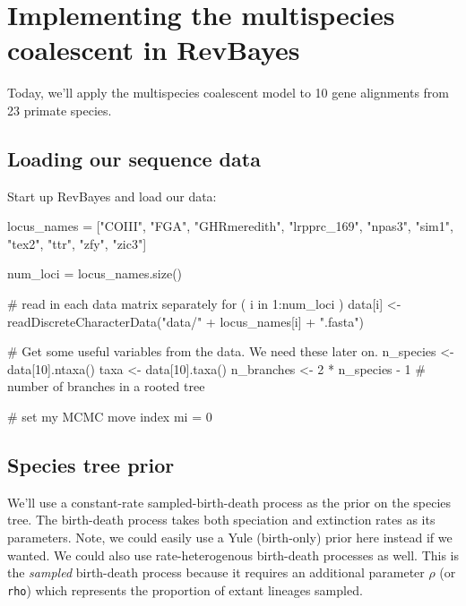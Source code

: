 \documentclass[11pt]{article}
\begin{document}
\section{Implementing the multispecies coalescent in RevBayes}

Today, we'll apply the multispecies coalescent model to 10 gene alignments from 23 primate species.

\subsection{Loading our sequence data}

Start up RevBayes and load our data:
\begin{code}
locus_names = ["COIII", "FGA", "GHRmeredith", "lrpprc_169", 
               "npas3", "sim1", "tex2", "ttr", "zfy", "zic3"]

num_loci = locus_names.size()

# read in each data matrix separately
for ( i in 1:num_loci ) {
    data[i] <- readDiscreteCharacterData("data/" + locus_names[i] + ".fasta")
}

# Get some useful variables from the data. We need these later on.
n_species <- data[10].ntaxa()
taxa <- data[10].taxa()
n_branches <- 2 * n_species - 1 # number of branches in a rooted tree

# set my MCMC move index
mi = 0
\end{code}

\subsection{Species tree prior}

We'll use a constant-rate sampled-birth-death process as the prior on the species tree.
The birth-death process takes both speciation and extinction rates as its parameters.
Note, we could easily use a Yule (birth-only) prior here instead if we wanted.
We could also use rate-heterogenous birth-death processes as well.
This is the \textit{sampled} birth-death process because it requires an additional
parameter $\rho$ (or \texttt{rho}) which represents the proportion of extant lineages sampled.
\end{document}
